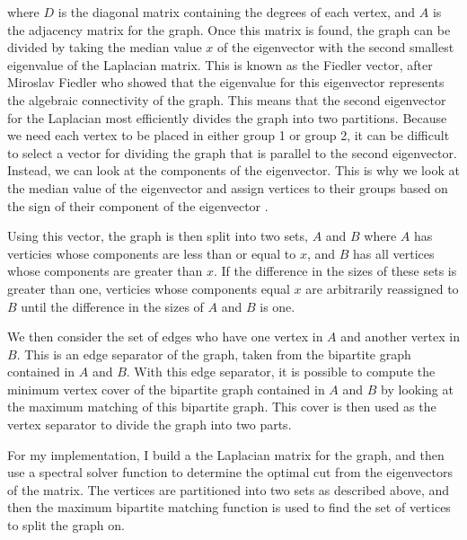 \documentclass{article}
\begin{document}
    where $D$ is the diagonal matrix containing the degrees of each vertex, and $A$ is the adjacency matrix for the graph. Once this matrix is found, the graph can be divided by taking the median value $x$ of the eigenvector with the second smallest eigenvalue of the Laplacian matrix. This is known as the Fiedler vector, after Miroslav Fiedler who showed that the eigenvalue for this eigenvector represents the algebraic connectivity of the graph. This means that the second eigenvector for the Laplacian most efficiently divides the graph into two partitions. Because we need each vertex to be placed in either group 1 or group 2, it can be difficult to select a vector for dividing the graph that is parallel to the second eigenvector. Instead, we can look at the components of the eigenvector. This is why we look at the median value of the eigenvector and assign vertices to their groups based on the sign of their component of the eigenvector \cite{Newman2006.2}.
    \par
    Using this vector, the graph is then split into two sets, $A$ and $B$ where $A$ has verticies whose components are less than or equal to $x$, and $B$ has all vertices whose components are greater than $x$. If the difference in the sizes of these sets is greater than one, verticies whose components equal $x$ are arbitrarily reassigned to $B$ until the difference in the sizes of $A$ and $B$ is one.
    \par
    We then consider the set of edges who have one vertex in $A$ and another vertex in $B$. This is an edge separator of the graph, taken from the bipartite graph contained in $A$ and $B$. With this edge separator, it is possible to compute the minimum vertex cover of the bipartite graph contained in $A$ and $B$ by looking at the maximum matching of this bipartite graph. This cover is then used as the vertex separator to divide the graph into two parts.
    \par
    For my implementation, I build a the Laplacian matrix for the graph, and then use a spectral solver function to determine the optimal cut from the eigenvectors of the matrix. The vertices are partitioned into two sets as described above, and then the maximum bipartite matching function is used to find the set of vertices to split the graph on.
\end{document}

